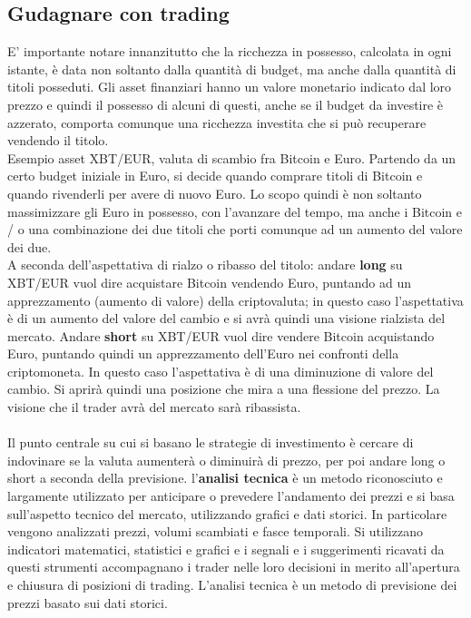 \documentclass{article}
\numberwithin{equation}{section}
\begin{document}
	\subsection{Gudagnare con trading}
		E' importante notare innanzitutto che la ricchezza in possesso, calcolata in ogni istante, è data non soltanto dalla quantità di budget, ma anche dalla quantità di titoli posseduti. Gli asset finanziari hanno un valore monetario indicato dal loro prezzo e quindi il possesso di alcuni di questi, anche se il budget da investire è azzerato, comporta comunque una ricchezza investita che si può recuperare vendendo il titolo.\\
		Esempio asset XBT/EUR, valuta di scambio fra Bitcoin e Euro. Partendo da un certo budget iniziale in Euro, si decide quando comprare titoli di Bitcoin e quando rivenderli per avere di nuovo Euro. Lo scopo quindi è non soltanto massimizzare gli Euro in possesso, con l'avanzare del tempo, ma anche i Bitcoin e / o una combinazione dei due titoli che porti comunque ad un aumento del valore dei due.\\
		A seconda dell'aspettativa di rialzo o ribasso del titolo: andare \textbf{long} su XBT/EUR vuol dire acquistare Bitcoin vendendo Euro, puntando ad un apprezzamento (aumento di valore) della criptovaluta; in questo caso l’aspettativa è di un aumento del valore del cambio e si avrà quindi una visione rialzista del mercato. Andare \textbf{short} su XBT/EUR vuol dire vendere Bitcoin acquistando Euro, puntando quindi un apprezzamento dell'Euro nei confronti della criptomoneta. In questo caso l’aspettativa è di una diminuzione di valore del cambio. Si aprirà quindi una posizione che mira a una flessione del prezzo. La visione che il trader avrà del mercato sarà ribassista.\\~\\
		Il punto centrale su cui si basano le strategie di investimento è cercare di indovinare se la valuta aumenterà o diminuirà di prezzo, per poi andare long o short a seconda della previsione. l'\textbf{analisi tecnica} è un metodo riconosciuto e largamente utilizzato per anticipare o prevedere l'andamento dei prezzi e si basa sull'aspetto tecnico del mercato, utilizzando grafici e dati storici. In particolare vengono analizzati prezzi, volumi scambiati e fasce temporali. Si utilizzano indicatori matematici, statistici e grafici e i segnali e i suggerimenti ricavati da questi strumenti accompagnano i trader nelle loro decisioni in merito all'apertura e chiusura di posizioni di trading. L'analisi tecnica è un metodo di previsione dei prezzi basato sui dati storici.
\end{document}
